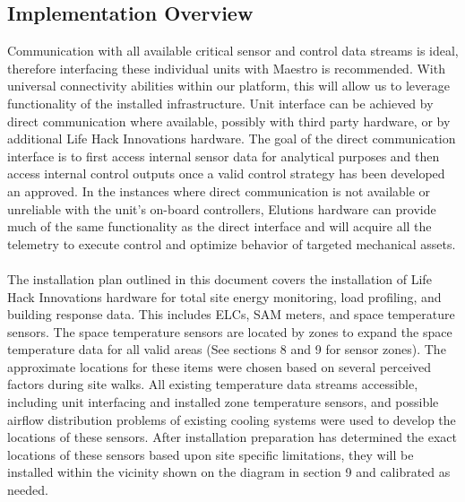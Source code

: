 \subsection{Implementation Overview}

Communication with all available critical sensor and control data streams is ideal, therefore interfacing these individual units with Maestro is recommended. With universal connectivity abilities within our platform, this will allow us to leverage functionality of the installed infrastructure. Unit interface can be achieved by direct communication where available, possibly with third party hardware, or by additional Life Hack Innovations hardware. The goal of the direct communication interface is to first access internal sensor data for analytical purposes and then access internal control outputs once a valid control strategy has been developed an approved. In the instances where direct communication is not available or unreliable with the unit’s on-board controllers, Elutions hardware can provide much of the same functionality as the direct interface and will acquire all the telemetry to execute control and optimize behavior of targeted mechanical assets.
\\
\\
The installation plan outlined in this document covers the installation of Life Hack Innovations hardware for total site energy monitoring, load profiling, and building response data. This includes ELCs, SAM meters, and space temperature sensors. The space temperature sensors are located by zones to expand the space temperature data for all valid areas (See sections 8 and 9 for sensor zones). The approximate locations for these items were chosen based on several perceived factors during site walks. All existing temperature data streams accessible, including unit interfacing and installed zone temperature sensors, and possible airflow distribution problems of existing cooling systems were used to develop the locations of these sensors. After installation preparation has determined the exact locations of these sensors based upon site specific limitations, they will be installed within the vicinity shown on the diagram in section 9 and calibrated as needed. 
\\
\\
